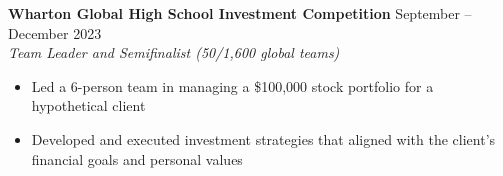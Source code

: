 \noindent
\textbf{Wharton Global High School Investment Competition} \hfill September -- December 2023 \\
\textit{Team Leader and Semifinalist (50/1,600 global teams)}
\begin{itemize}
	\item Led a 6-person team in managing a \$100,000 stock portfolio for a hypothetical client
	\item Developed and executed investment strategies that aligned with the client's financial goals and personal values
\end{itemize}
